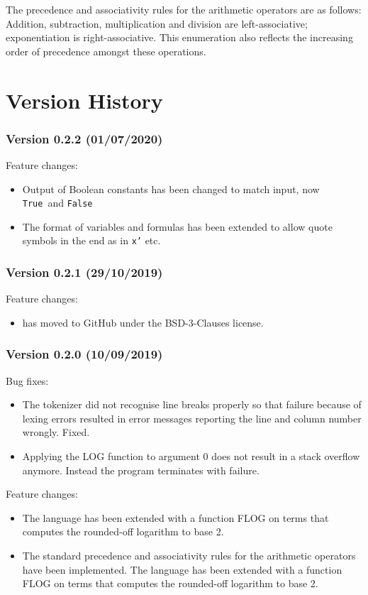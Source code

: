 \documentclass[twoside]{article}
\begin{document}
The precedence and associativity rules for the arithmetic operators are as follows: Addition, subtraction, multiplication and division are left-associative; exponentiation is 
right-associative. This enumeration also reflects the increasing order of precedence amongst these operations.


\section{Version History}


\subsubsection*{Version 0.2.2 (01/07/2020)}

Feature changes:
\begin{itemize}
\item Output of Boolean constants has been changed to match input, now \texttt{True} and \texttt{False}
\item The format of variables and formulas has been extended to allow quote symbols in the end as in \texttt{x'} etc.
\end{itemize}

\subsubsection*{Version 0.2.1 (29/10/2019)}

Feature changes:
\begin{itemize}
\item \DiMo has moved to GitHub under the BSD-3-Clauses license.
\end{itemize}


\subsubsection*{Version 0.2.0 (10/09/2019)}

Bug fixes:
\begin{itemize}
\item The tokenizer did not recognise line breaks properly so that failure because of lexing errors resulted in error messages reporting the line and column number wrongly. Fixed.
\item Applying the LOG function to argument 0 does not result in a stack overflow anymore. Instead the program terminates with failure. 
\end{itemize}
Feature changes:
\begin{itemize}
\item The \DiMo language has been extended with a function FLOG on terms that computes the rounded-off logarithm to base 2.
\item The standard precedence and associativity rules for the arithmetic operators have been implemented. The \DiMo language has been extended with a function FLOG on terms that computes the rounded-off logarithm to base 2.
\end{itemize}
\end{document}
